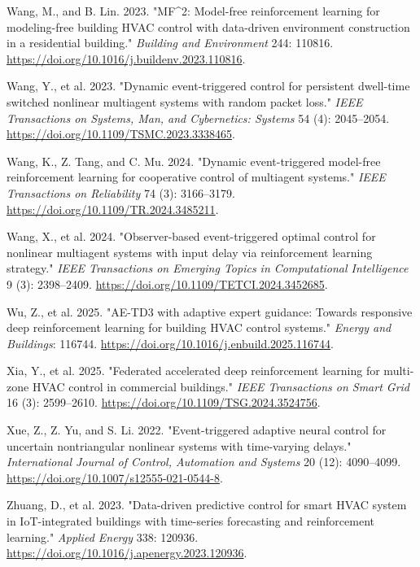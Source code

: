 \documentclass[preprint,12pt]{elsarticle}
\newenvironment{reflist}{%
  \begin{list}{}{%
    \setlength{\leftmargin}{2.2em}%
    \setlength{\itemindent}{-2.2em}%
    \setlength{\itemsep}{2pt}%
    \setlength{\parsep}{0pt}%
  }%
  \raggedright
}{%
  \end{list}
}
\begin{document}
\begin{reflist}
\item Wang, M., and B. Lin. 2023. "MF\textasciicircum{}2: Model-free reinforcement learning for modeling-free building HVAC control with data-driven environment construction in a residential building." \textit{Building and Environment} 244: 110816. \url{https://doi.org/10.1016/j.buildenv.2023.110816}.
\item Wang, Y., et al. 2023. "Dynamic event-triggered control for persistent dwell-time switched nonlinear multiagent systems with random packet loss." \textit{IEEE Transactions on Systems, Man, and Cybernetics: Systems} 54 (4): 2045--2054. \url{https://doi.org/10.1109/TSMC.2023.3338465}.
\item Wang, K., Z. Tang, and C. Mu. 2024. "Dynamic event-triggered model-free reinforcement learning for cooperative control of multiagent systems." \textit{IEEE Transactions on Reliability} 74 (3): 3166--3179. \url{https://doi.org/10.1109/TR.2024.3485211}.
\item Wang, X., et al. 2024. "Observer-based event-triggered optimal control for nonlinear multiagent systems with input delay via reinforcement learning strategy." \textit{IEEE Transactions on Emerging Topics in Computational Intelligence} 9 (3): 2398--2409. \url{https://doi.org/10.1109/TETCI.2024.3452685}.
\item Wu, Z., et al. 2025. "AE-TD3 with adaptive expert guidance: Towards responsive deep reinforcement learning for building HVAC control systems." \textit{Energy and Buildings}: 116744. \url{https://doi.org/10.1016/j.enbuild.2025.116744}.
\item Xia, Y., et al. 2025. "Federated accelerated deep reinforcement learning for multi-zone HVAC control in commercial buildings." \textit{IEEE Transactions on Smart Grid} 16 (3): 2599--2610. \url{https://doi.org/10.1109/TSG.2024.3524756}.
\item Xue, Z., Z. Yu, and S. Li. 2022. "Event-triggered adaptive neural control for uncertain nontriangular nonlinear systems with time-varying delays." \textit{International Journal of Control, Automation and Systems} 20 (12): 4090--4099. \url{https://doi.org/10.1007/s12555-021-0544-8}.
\item Zhuang, D., et al. 2023. "Data-driven predictive control for smart HVAC system in IoT-integrated buildings with time-series forecasting and reinforcement learning." \textit{Applied Energy} 338: 120936. \url{https://doi.org/10.1016/j.apenergy.2023.120936}.
\end{reflist}
\end{document}
